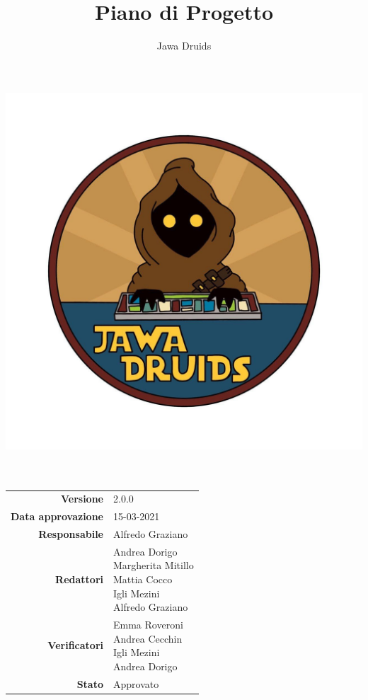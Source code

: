 




\makeatletter
\begin{titlepage}
	\begin{center}
		\vspace*{-5cm}
		\author{Jawa Druids}
		\title{Piano di Progetto}
		\date{} %
		\includegraphics[width=0.5\linewidth]{../immagini/DRUIDSLOGO.jpg}\\[4ex]
		{\huge \bfseries  \@title }\\[2ex]
		{\LARGE  \@author}\\[50ex]
		\vspace*{-9cm}
		\begin{table}[H]
			\renewcommand{\arraystretch}{1.4}
			\centering
			\begin{tabular}{r | l}
				\textbf{Versione} & 2.0.0 \\%
				\textbf{Data approvazione} & 15-03-2021\\
				\textbf{Responsabile} & Alfredo Graziano\\
				\textbf{Redattori} & \makecell[tl]{Andrea Dorigo \\ Margherita Mitillo \\ Mattia Cocco \\ Igli Mezini \\ Alfredo Graziano} \\
				\textbf{Verificatori} & \makecell[tl]{Emma Roveroni \\ Andrea Cecchin \\ Igli Mezini \\ Andrea Dorigo} \\
				\textbf{Stato} & Approvato\\

\end{tabular}
\end{table}
\end{center}
\end{titlepage}
